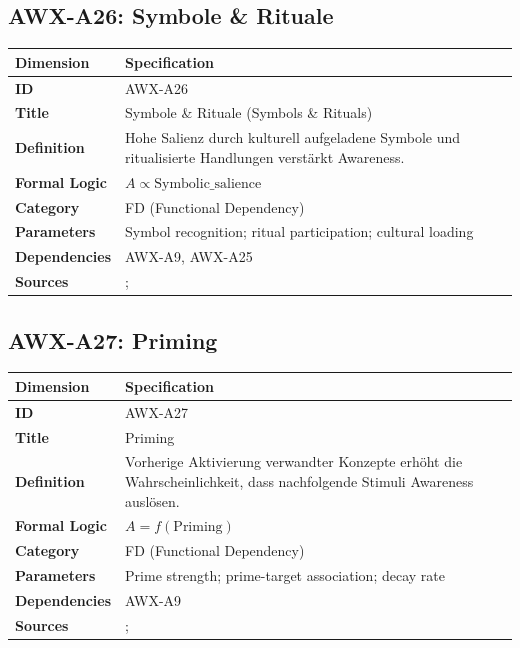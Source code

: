 
\subsection{AWX-A26: Symbole \& Rituale}

\begin{table}[htbp]
\small
\begin{tabular}{p{3cm}p{11cm}}
\toprule
\textbf{Dimension} & \textbf{Specification} \\
\midrule
\textbf{ID} & AWX-A26 \\
\textbf{Title} & Symbole \& Rituale (Symbols \& Rituals) \\
\textbf{Definition} & Hohe Salienz durch kulturell aufgeladene Symbole und ritualisierte Handlungen verstärkt Awareness. \\
\textbf{Formal Logic} & $A \propto \text{Symbolic\_salience}$ \\
\textbf{Category} & FD (Functional Dependency) \\
\textbf{Parameters} & Symbol recognition; ritual participation; cultural loading \\
\textbf{Dependencies} & AWX-A9, AWX-A25 \\
\textbf{Sources} & \citet{PAP-akerlof2000identity}; \citet{akerlof2010identity} \\
\bottomrule
\end{tabular}
\end{table}


\subsection{AWX-A27: Priming}

\begin{table}[htbp]
\small
\begin{tabular}{p{3cm}p{11cm}}
\toprule
\textbf{Dimension} & \textbf{Specification} \\
\midrule
\textbf{ID} & AWX-A27 \\
\textbf{Title} & Priming \\
\textbf{Definition} & Vorherige Aktivierung verwandter Konzepte erhöht die Wahrscheinlichkeit, dass nachfolgende Stimuli Awareness auslösen. \\
\textbf{Formal Logic} & $A = f(\text{Priming})$ \\
\textbf{Category} & FD (Functional Dependency) \\
\textbf{Parameters} & Prime strength; prime-target association; decay rate \\
\textbf{Dependencies} & AWX-A9 \\
\textbf{Sources} & \citet{bargh1996automaticity}; \citet{PAP-kahneman2003maps} \\
\bottomrule
\end{tabular}
\end{table}

